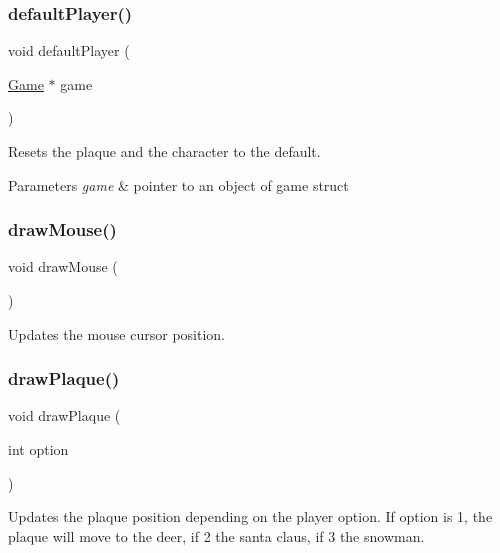 \subsubsection{\texorpdfstring{default\+Player()}{defaultPlayer()}}
{\footnotesize\ttfamily void default\+Player (\begin{DoxyParamCaption}\item[{\hyperlink{struct_game}{Game} $\ast$}]{game }\end{DoxyParamCaption})}



Resets the plaque and the character to the default. 


\begin{DoxyParams}{Parameters}
{\em game} & pointer to an object of game struct \\
\hline
\end{DoxyParams}
\mbox{\label{group___graphics_gaab7430a217db9969c46ead48adffbd05}} 
\subsubsection{\texorpdfstring{draw\+Mouse()}{drawMouse()}}
{\footnotesize\ttfamily void draw\+Mouse (\begin{DoxyParamCaption}{ }\end{DoxyParamCaption})}



Updates the mouse cursor position. 

\mbox{\label{group___graphics_gad185badd1bb6af7027ee2fba1539c055}} 
\subsubsection{\texorpdfstring{draw\+Plaque()}{drawPlaque()}}
{\footnotesize\ttfamily void draw\+Plaque (\begin{DoxyParamCaption}\item[{int}]{option }\end{DoxyParamCaption})}



Updates the plaque position depending on the player option. If option is 1, the plaque will move to the deer, if 2 the santa claus, if 3 the snowman. 


